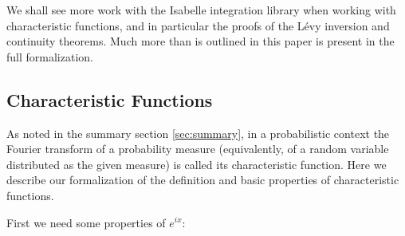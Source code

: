 \documentclass{article}
\theoremstyle{definition}
\begin{document}
\medskip

We shall see more work with the Isabelle integration library when working with characteristic functions, and in particular the proofs of the L\'evy inversion and continuity theorems. Much more than is outlined in this paper is present in the full formalization.

\subsection{Characteristic Functions}

As noted in the summary section \ref{sec:summary}, in a probabilistic context the Fourier transform of a probability measure (equivalently, of a random variable distributed as the given measure) is called its characteristic function. Here we describe our formalization of the definition and basic properties of characteristic functions.

First we need some properties of $e^{ix}$:

\medskip
\end{document}
